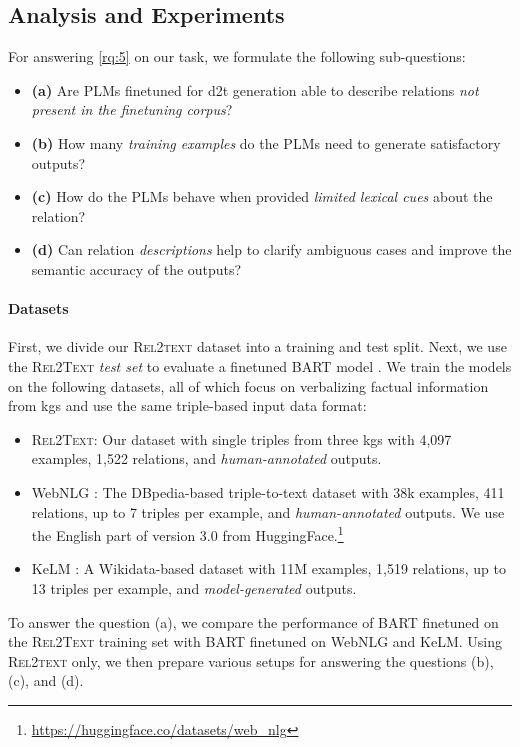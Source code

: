 \subsection{Analysis and Experiments}
\label{sec:rel2text:analysis}
For answering \ref{rq:5} on our task, we formulate the following sub-questions:
\begin{itemize}
    \item \textbf{(a)} Are PLMs finetuned for \ac{d2t} generation able to describe relations \textit{not present in the finetuning corpus}?
    \item \textbf{(b)} How many \textit{training examples} do the PLMs need to generate satisfactory outputs?
    \item \textbf{(c)} How do the PLMs behave when provided \textit{limited lexical cues} about the relation?
    \item \textbf{(d)} Can relation \textit{descriptions} help to clarify ambiguous cases and improve the semantic accuracy of the outputs?
\end{itemize}

\paragraph*{Datasets}  First, we divide our \textsc{Rel2text} dataset into a training and test split. Next, we use the \textsc{Rel2Text} \emph{test set} to evaluate a finetuned BART model \cite{lewisBARTDenoisingSequencetoSequence2019}. We train the models on the following datasets, all of which focus on verbalizing factual information from \acp{kg} and use the same triple-based input data format:
\begin{itemize}
    \item \textsc{Rel2Text}: Our dataset with single triples from three \acp{kg} with 4,097 examples, 1,522 relations, and \textit{human-annotated} outputs.
    \item WebNLG \cite[see \autoref{sec:datasets}]{ferreira20202020,gardentWebNLGChallengeGenerating2017}: The DBpedia-based triple-to-text dataset with 38k examples, 411 relations, up to 7 triples per example, and \textit{human-annotated} outputs. We use the English part of version 3.0 from HuggingFace.\footnote{\url{https://huggingface.co/datasets/web_nlg}}
    \item KeLM \cite{agarwalKnowledgeGraphBased2021}: A Wikidata-based dataset with 11M examples, 1,519 relations, up to 13 triples per example, and \textit{model-generated} outputs.
\end{itemize}
To answer the question (a), we compare the performance of BART finetuned on the \textsc{Rel2Text} training set with BART finetuned on WebNLG and KeLM. Using \textsc{Rel2text} only, we then prepare various setups for answering the questions (b), (c), and (d).


